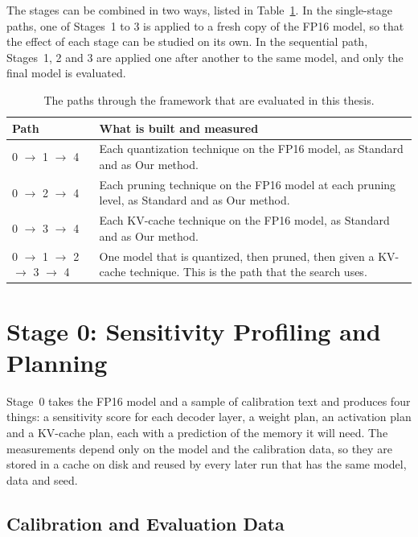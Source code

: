 The stages can be combined in two ways, listed in Table~\ref{tab:ch4-paths}. In the single-stage paths, one of Stages~1 to 3 is applied to a fresh copy of the FP16 model, so that the effect of each stage can be studied on its own. In the sequential path, Stages~1, 2 and 3 are applied one after another to the same model, and only the final model is evaluated.

\begin{table}[htbp]
\centering
\small
\caption{The paths through the framework that are evaluated in this thesis.}
\label{tab:ch4-paths}
\renewcommand{\arraystretch}{1.2}
\begin{tabularx}{\textwidth}{lX}
\hline
\textbf{Path} & \textbf{What is built and measured} \\
\hline
0 $\rightarrow$ 1 $\rightarrow$ 4 & Each quantization technique on the FP16 model, as Standard and as Our method. \\
0 $\rightarrow$ 2 $\rightarrow$ 4 & Each pruning technique on the FP16 model at each pruning level, as Standard and as Our method. \\
0 $\rightarrow$ 3 $\rightarrow$ 4 & Each KV-cache technique on the FP16 model, as Standard and as Our method. \\
0 $\rightarrow$ 1 $\rightarrow$ 2 $\rightarrow$ 3 $\rightarrow$ 4 & One model that is quantized, then pruned, then given a KV-cache technique. This is the path that the search uses. \\
\hline
\end{tabularx}
\end{table}

\section{Stage 0: Sensitivity Profiling and Planning}
\label{sec:ch4-stage0}

Stage~0 takes the FP16 model and a sample of calibration text and produces four things: a sensitivity score for each decoder layer, a weight plan, an activation plan and a KV-cache plan, each with a prediction of the memory it will need. The measurements depend only on the model and the calibration data, so they are stored in a cache on disk and reused by every later run that has the same model, data and seed.

\subsection{Calibration and Evaluation Data}
\label{sec:ch4-data}

